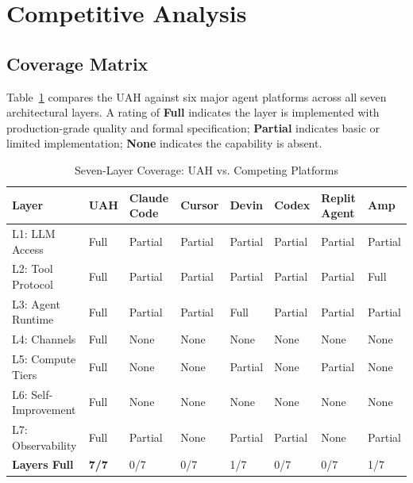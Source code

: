 \documentclass[11pt]{article}
\begin{document}
\section{Competitive Analysis}
\label{sec:competitive}

\subsection{Coverage Matrix}

Table~\ref{tab:competitive} compares the UAH against six major agent platforms
across all seven architectural layers. A rating of \textbf{Full} indicates the
layer is implemented with production-grade quality and formal specification;
\textbf{Partial} indicates basic or limited implementation; \textbf{None}
indicates the capability is absent.

\begin{table}[H]
\centering
\caption{Seven-Layer Coverage: UAH vs. Competing Platforms}
\label{tab:competitive}
\setlength{\tabcolsep}{4pt}
\begin{tabularx}{\textwidth}{lXXXXXXX}
\toprule
\textbf{Layer} & \textbf{UAH} & \textbf{Claude Code} & \textbf{Cursor} &
\textbf{Devin} & \textbf{Codex} & \textbf{Replit Agent} & \textbf{Amp} \\
\midrule
L1: LLM Access      & Full    & Partial & Partial & Partial & Partial & Partial & Partial \\
L2: Tool Protocol   & Full    & Partial & Partial & Partial & Partial & Partial & Full    \\
L3: Agent Runtime   & Full    & Partial & Partial & Full    & Partial & Partial & Partial \\
L4: Channels        & Full    & None    & None    & None    & None    & None    & None    \\
L5: Compute Tiers   & Full    & None    & None    & Partial & None    & Partial & None    \\
L6: Self-Improvement & Full   & None    & None    & None    & None    & None    & None    \\
L7: Observability   & Full    & Partial & None    & Partial & Partial & None    & Partial \\
\midrule
\textbf{Layers Full} & \textbf{7/7} & 0/7 & 0/7 & 1/7 & 0/7 & 0/7 & 1/7 \\
\bottomrule
\end{tabularx}
\end{table}
\end{document}
